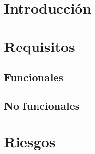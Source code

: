 \section{Introducción}

\section{Requisitos}
\subsection{Funcionales}
\subsection{No funcionales}

\section{Riesgos}

